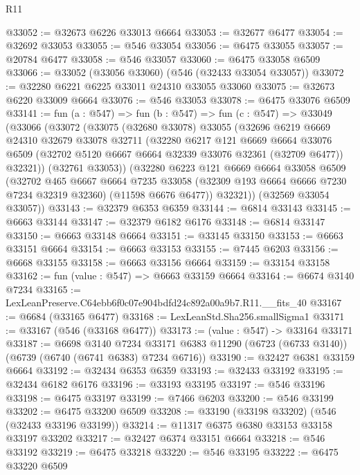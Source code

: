 \begin{lexlean}{R11}
\begin{coremodule}
@33052 := @32673 @6226 @33013 @6664
@33053 := @32677 @6477
@33054 := @32692 @33053
@33055 := @546 @33054
@33056 := @6475 @33055
@33057 := @20784 @6477
@33058 := @546 @33057
@33060 := @6475 @33058 @6509
@33066 := @33052 (@33056 @33060) (@546 (@32433 @33054 @33057))
@33072 := @32280 @6221 @6225 @33011 @24310 @33055 @33060
@33075 := @32673 @6220 @33009 @6664
@33076 := @546 @33053
@33078 := @6475 @33076 @6509
@33141 := fun (a : @547) =>
  fun (b : @547) =>
  fun (c : @547) =>
  @33049
    (@33066
      (@33072
        (@33075
          (@32680 @33078)
          @33055
          (@32696
            @6219
            @6669
            @24310
            @32679
            @33078
            @32711
            (@32280
              @6217
              @121
              @6669
              @6664
              @33076
              @6509
              (@32702 @5120 @6667 @6664 @32339 @33076 @32361 (@32709 @6477))
              @32321))
          (@32761 @33053))
        (@32280
          @6223
          @121
          @6669
          @6664
          @33058
          @6509
          (@32702
            @465
            @6667
            @6664
            @7235
            @33058
            (@32309 @193 @6664 @6666 @7230 @7234 @32319 @32360)
            (@11598 @6676 @6477))
          @32321))
      (@32569 @33054 @33057))
@33143 := @32379 @6353 @6359
@33144 := @6814 @33143
@33145 := @6663 @33144
@33147 := @32379 @6182 @6176
@33148 := @6814 @33147
@33150 := @6663 @33148 @6664
@33151 := @33145 @33150
@33153 := @6663 @33151 @6664
@33154 := @6663 @33153
@33155 := @7445 @6203
@33156 := @6668 @33155
@33158 := @6663 @33156 @6664
@33159 := @33154 @33158
@33162 := fun (value : @547) => @6663 @33159 @6664
@33164 := @6674 @3140 @7234
@33165 := LexLeanPreserve.C64ebb6f0c07e904bdfd24c892a00a9b7.R11.__fits_40
@33167 := @6684 (@33165 @6477)
@33168 := LexLeanStd.Sha256.smallSigma1
@33171 := @33167 (@546 (@33168 @6477))
@33173 := (value : @547) -> @33164 @33171
@33187 := @6698
    @3140
    @7234
    @33171
    @6383
    @11290
    (@6723 (@6733 @3140))
    (@6739 (@6740 (@6741 @6383) @7234 @6716))
@33190 := @32427 @6381 @33159 @6664
@33192 := @32434 @6353 @6359
@33193 := @32433 @33192
@33195 := @32434 @6182 @6176
@33196 := @33193 @33195
@33197 := @546 @33196
@33198 := @6475 @33197
@33199 := @7466 @6203
@33200 := @546 @33199
@33202 := @6475 @33200 @6509
@33208 := @33190 (@33198 @33202) (@546 (@32433 @33196 @33199))
@33214 := @11317 @6375 @6380 @33153 @33158 @33197 @33202
@33217 := @32427 @6374 @33151 @6664
@33218 := @546 @33192
@33219 := @6475 @33218
@33220 := @546 @33195
@33222 := @6475 @33220 @6509

\end{coremodule}
\end{lexlean}
